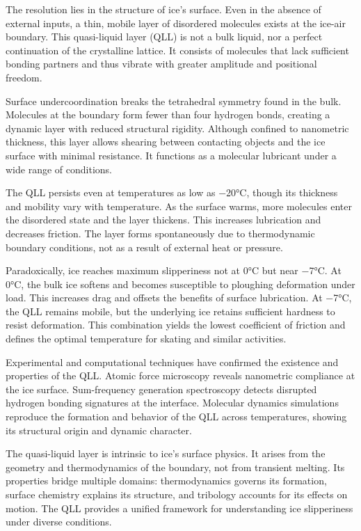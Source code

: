 The resolution lies in the structure of ice's surface. Even in the absence of external inputs, a thin, mobile layer of disordered molecules exists at the ice-air boundary. This quasi-liquid layer (QLL) is not a bulk liquid, nor a perfect continuation of the crystalline lattice. It consists of molecules that lack sufficient bonding partners and thus vibrate with greater amplitude and positional freedom.

Surface undercoordination breaks the tetrahedral symmetry found in the bulk. Molecules at the boundary form fewer than four hydrogen bonds, creating a dynamic layer with reduced structural rigidity. Although confined to nanometric thickness, this layer allows shearing between contacting objects and the ice surface with minimal resistance. It functions as a molecular lubricant under a wide range of conditions.

The QLL persists even at temperatures as low as −20°C, though its thickness and mobility vary with temperature. As the surface warms, more molecules enter the disordered state and the layer thickens. This increases lubrication and decreases friction. The layer forms spontaneously due to thermodynamic boundary conditions, not as a result of external heat or pressure.

Paradoxically, ice reaches maximum slipperiness not at 0°C but near −7°C. At 0°C, the bulk ice softens and becomes susceptible to ploughing deformation under load. This increases drag and offsets the benefits of surface lubrication. At −7°C, the QLL remains mobile, but the underlying ice retains sufficient hardness to resist deformation. This combination yields the lowest coefficient of friction and defines the optimal temperature for skating and similar activities.

Experimental and computational techniques have confirmed the existence and properties of the QLL. Atomic force microscopy reveals nanometric compliance at the ice surface. Sum-frequency generation spectroscopy detects disrupted hydrogen bonding signatures at the interface. Molecular dynamics simulations reproduce the formation and behavior of the QLL across temperatures, showing its structural origin and dynamic character.

The quasi-liquid layer is intrinsic to ice's surface physics. It arises from the geometry and thermodynamics of the boundary, not from transient melting. Its properties bridge multiple domains: thermodynamics governs its formation, surface chemistry explains its structure, and tribology accounts for its effects on motion. The QLL provides a unified framework for understanding ice slipperiness under diverse conditions.

